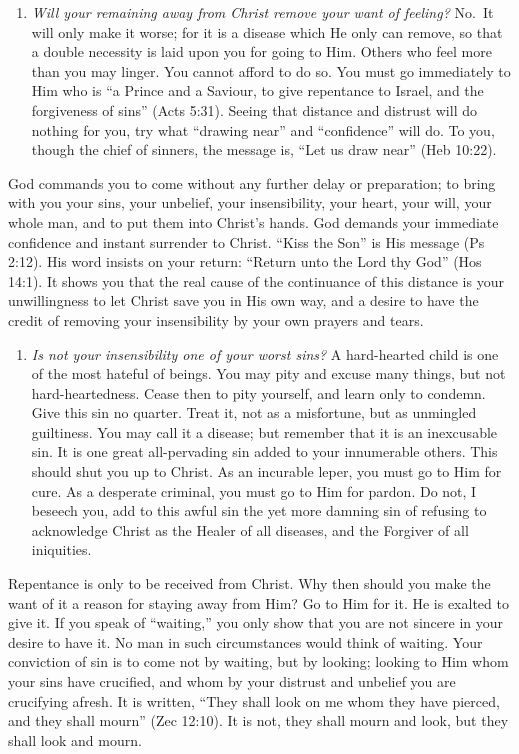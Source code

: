 \documentclass[
]{book}
\providecommand{\tightlist}{%
  \setlength{\itemsep}{0pt}\setlength{\parskip}{0pt}}
\begin{document}
\begin{enumerate}
\item
  \emph{Will your remaining away from Christ remove your want of feeling?} No.~It will only make it worse; for it is a disease which He only can remove, so that a double necessity is laid upon you for going to Him. Others who feel more than you may linger. You cannot afford to do so. You must go immediately to Him who is ``a Prince and a Saviour, to give repentance to Israel, and the forgiveness of sins'' (Acts 5:31). Seeing that distance and distrust will do nothing for you, try what ``drawing near'' and ``confidence'' will do. To you, though the chief of sinners, the message is, ``Let us draw near'' (Heb 10:22).
\end{enumerate}

God commands you to come without any further delay or preparation; to bring with you your sins, your unbelief, your insensibility, your heart, your will, your whole man, and to put them into Christ's hands. God demands your immediate confidence and instant surrender to Christ. ``Kiss the Son'' is His message (Ps 2:12). His word insists on your return: ``Return unto the Lord thy God'' (Hos 14:1). It shows you that the real cause of the continuance of this distance is your unwillingness to let Christ save you in His own way, and a desire to have the credit of removing your insensibility by your own prayers and tears.

\begin{enumerate}
\def\labelenumi{\arabic{enumi}.}
\setcounter{enumi}{5}
\tightlist
\item
  \emph{Is not your insensibility one of your worst sins?} A hard-hearted child is one of the most hateful of beings. You may pity and excuse many things, but not hard-heartedness. Cease then to pity yourself, and learn only to condemn. Give this sin no quarter. Treat it, not as a misfortune, but as unmingled guiltiness. You may call it a disease; but remember that it is an inexcusable sin. It is one great all-pervading sin added to your innumerable others. This should shut you up to Christ. As an incurable leper, you must go to Him for cure. As a desperate criminal, you must go to Him for pardon. Do not, I beseech you, add to this awful sin the yet more damning sin of refusing to acknowledge Christ as the Healer of all diseases, and the Forgiver of all iniquities.
\end{enumerate}

Repentance is only to be received from Christ. Why then should you make the want of it a reason for staying away from Him? Go to Him for it. He is exalted to give it. If you speak of ``waiting,'' you only show that you are not sincere in your desire to have it. No man in such circumstances would think of waiting. Your conviction of sin is to come not by waiting, but by looking; looking to Him whom your sins have crucified, and whom by your distrust and unbelief you are crucifying afresh. It is written, ``They shall look on me whom they have pierced, and they shall mourn'' (Zec 12:10). It is not, they shall mourn and look, but they shall look and mourn.
\end{document}
